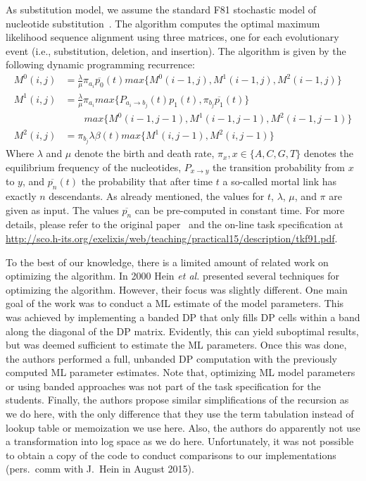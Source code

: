 \documentclass[runningheads,a4paper]{llncs}
\begin{document}
As substitution model, we assume the standard F81 stochastic model of nucleotide substitution~\cite{felsenstein1981evolutionary}. 
The algorithm computes the optimal maximum likelihood sequence alignment using three matrices, one for each evolutionary event (i.e., substitution, deletion, and insertion).
The algorithm is given by the following dynamic programming recurrence: 
\[
\begin{aligned}
  M^0(i,j)&=\frac{\lambda}{\mu}\pi_{a_i}\overline{p_0}(t)max\{M^0(i-1, j), M^1(i-1,j), M^2(i-1,j)\}\\
  M^1(i,j)&=\frac{\lambda}{\mu}\pi_{a_i}max\{P_{a_i \rightarrow b_j}(t) p_1(t), \pi_{b_j}\overline{p_1}(t)\}\\
          &\quad\quad max\{M^0(i-1, j-1), M^1(i-1,j-1), M^2(i-1,j-1)\}\\
  M^2(i,j)&=\pi_{b_j}\lambda\beta(t)max\{M^1(i,j-1), M^2(i,j-1)\}
\end{aligned}
\]
Where $\lambda$ and $\mu$ denote the birth and death rate, $\pi_x, x \in \{A,C,G,T\}$ denotes the equilibrium frequency of the nucleotides, 
$P_{x \rightarrow y}$ the transition probability from $x$ to $y$, and $\overline{p_n}(t)$ the probability that after time $t$ a so-called mortal link has exactly $n$ descendants. 
As already mentioned, the values for $t$, $\lambda$, $\mu$, and $\pi$ are given as input. 
The values $\overline{p_n}$ can be pre-computed in constant time. For more details, please refer to the original paper~\cite{felsenstein1981evolutionary} and the on-line 
task specification at \url{http://sco.h-its.org/exelixis/web/teaching/practical15/description/tkf91.pdf}.

To the best of our knowledge, there is a limited amount of related work on optimizing the algorithm. 
In 2000 Hein {\em et al.}\cite{hein2000statistical} presented several techniques for optimizing the algorithm. However, their focus was slightly different. One main 
goal of the work was to conduct a ML estimate of the model parameters. This was achieved by implementing a banded DP that only fills DP cells
within a band along the diagonal of the DP matrix. Evidently, this can yield suboptimal results, but was deemed sufficient to estimate the ML parameters. 
Once this was done, the authors performed a full, unbanded DP computation with the previously computed ML parameter estimates. 
Note that, optimizing ML model parameters or using banded approaches was not part of the task specification for the students. 
Finally, the authors propose similar simplifications of the recursion as we do here, with the only difference that they use 
the term tabulation instead of lookup table or memoization we use here. 
Also, the authors do apparently not use a transformation into log space as we do here. Unfortunately, it was not possible to obtain 
a copy of the code to conduct comparisons to our implementations (pers.~comm with J.~Hein in August 2015).
\end{document}
